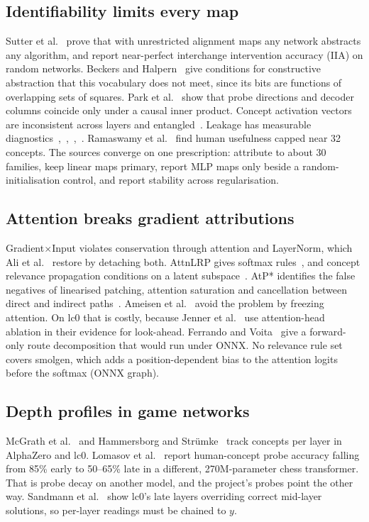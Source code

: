 \documentclass[conference]{IEEEtran}
\begin{document}
\subsection{Identifiability limits every map}\label{sec:4.6}
Sutter et al.~\cite{sutter2025} prove that with unrestricted alignment maps any network abstracts any algorithm, and report near-perfect interchange intervention accuracy (IIA) on random networks. Beckers and Halpern~\cite{beckers2019} give conditions for constructive abstraction that this vocabulary does not meet, since its bits are functions of overlapping sets of squares. Park et al.~\cite{park2024} show that probe directions and decoder columns coincide only under a causal inner product. Concept activation vectors are inconsistent across layers and entangled~\cite{nicolson2025}. Leakage has measurable diagnostics~\cite{mahinpei2021},~\cite{espinosa2023},~\cite{parisini2026},~\cite{huang2024}. Ramaswamy et al.~\cite{ramaswamy2023} find human usefulness capped near 32 concepts. The sources converge on one prescription: attribute to about 30 families, keep linear maps primary, report MLP maps only beside a random-initialisation control, and report stability across regularisation.

\subsection{Attention breaks gradient attributions}\label{sec:4.7}
Gradient$\times$Input violates conservation through attention and LayerNorm, which Ali et al.~\cite{ali2022} restore by detaching both. AttnLRP gives softmax rules~\cite{achtibat2024}, and concept relevance propagation conditions on a latent subspace~\cite{achtibat2023}. AtP* identifies the false negatives of linearised patching, attention saturation and cancellation between direct and indirect paths~\cite{kramar2024}. Ameisen et al.~\cite{ameisen2025} avoid the problem by freezing attention. On lc0 that is costly, because Jenner et al.~\cite{jenner2024} use attention-head ablation in their evidence for look-ahead. Ferrando and Voita~\cite{ferrando2024} give a forward-only route decomposition that would run under ONNX. No relevance rule set covers smolgen, which adds a position-dependent bias to the attention logits before the softmax (ONNX graph).

\subsection{Depth profiles in game networks}\label{sec:4.8}
McGrath et al.~\cite{mcgrath2022} and Hammersborg and Strümke~\cite{hammersborg2024} track concepts per layer in AlphaZero and lc0. Lomasov et al.~\cite{lomasov2025} report human-concept probe accuracy falling from 85\% early to 50--65\% late in a different, 270M-parameter chess transformer. That is probe decay on another model, and the project's probes point the other way. Sandmann et al.~\cite{sandmann2025} show lc0's late layers overriding correct mid-layer solutions, so per-layer readings must be chained to $y$.
\end{document}
